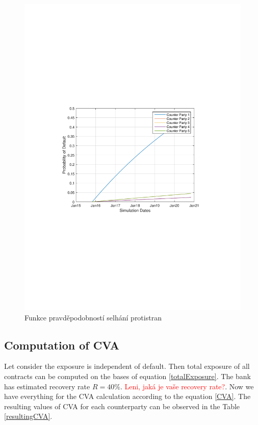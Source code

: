\documentclass[a4paper,12pt]{report}
\theoremstyle{definition} \newtheorem{definice}[veta]{Definice}
\theoremstyle{remark}
\begin{document}
\begin{figure}[!htbp]
  \centering 
	\includegraphics[width=13cm, clip, trim= 100 270 110 270]{IMG/DefaultProbability.pdf}
  \caption{Funkce pravděpodobností selhání protistran}  \label{DefaultProbability}
\end{figure}


\subsection{Computation of CVA} 
Let consider the exposure is independent of default. Then total exposure of all contracts can be computed on the bases of equation \eqref{totalExposure}. The bank has estimated recovery rate $R=40\%$. \textcolor{red}{Leni, jaká je vaše recovery rate?}. Now we have everything for the CVA calculation according to the equation \eqref{CVA}. The resulting values of CVA for each counterparty can be observed in the Table \ref{resultingCVA}.
\end{document}

